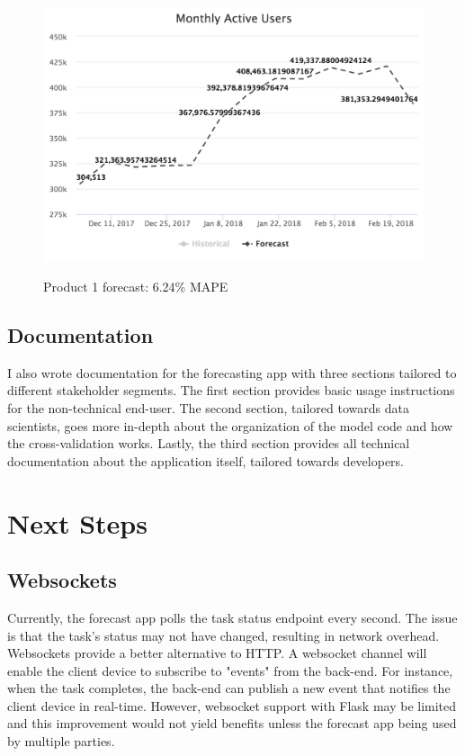 \documentclass[11pt, oneside]{article}
\begin{document}
\begin{figure}[h]
  \caption{Product 1 forecast: 6.24\% MAPE}
  \centering
  \includegraphics[width=12.5cm]{images/Product_1-Forecast-6_24_Percent_MAPE.png}
  \label{fig:Product_1-Forecast}
\end{figure}

\subsection{Documentation}
I also wrote documentation for the forecasting app with three sections tailored to different stakeholder segments. The first section provides basic usage instructions for the non-technical end-user. The second section, tailored towards data scientists, goes more in-depth about the organization of the model code and how the cross-validation works. Lastly, the third section provides all technical documentation about the application itself, tailored towards developers.

\section{Next Steps}
\subsection{Websockets}
Currently, the forecast app polls the task status endpoint every second. The issue is that the task's status may not have changed, resulting in network overhead. Websockets provide a better alternative to HTTP. A websocket channel will enable the client device to subscribe to "events" from the back-end. For instance, when the task completes, the back-end can publish a new event that notifies the client device in real-time. However, websocket support with Flask may be limited and this improvement would not yield benefits unless the forecast app being used by multiple parties.
\end{document}
